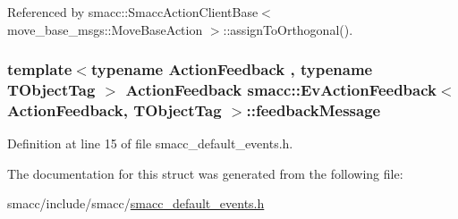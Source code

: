 Referenced by smacc\+::\+Smacc\+Action\+Client\+Base$<$ move\+\_\+base\+\_\+msgs\+::\+Move\+Base\+Action $>$\+::assign\+To\+Orthogonal().

\subsubsection[{\texorpdfstring{feedback\+Message}{feedbackMessage}}]{\setlength{\rightskip}{0pt plus 5cm}template$<$typename Action\+Feedback , typename T\+Object\+Tag $>$ Action\+Feedback {\bf smacc\+::\+Ev\+Action\+Feedback}$<$ Action\+Feedback, T\+Object\+Tag $>$\+::feedback\+Message}\hypertarget{structsmacc_1_1EvActionFeedback_ae00f5e85eb9cec0d02ca394460d60015}{}\label{structsmacc_1_1EvActionFeedback_ae00f5e85eb9cec0d02ca394460d60015}


Definition at line 15 of file smacc\+\_\+default\+\_\+events.\+h.



The documentation for this struct was generated from the following file\+:\begin{DoxyCompactItemize}
\item 
smacc/include/smacc/\hyperlink{smacc__default__events_8h}{smacc\+\_\+default\+\_\+events.\+h}\end{DoxyCompactItemize}
